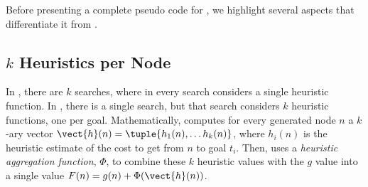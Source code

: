 





Before presenting a complete pseudo code for \kastar, we highlight several aspects that differentiate it from \kxastar.


\subsection{$k$ Heuristics per Node}

In \kxastar, there are $k$ searches, where in every search considers a single heuristic function. In \kastar, there is a single search, but that search considers $k$ heuristic functions, one per goal. 
Mathematically, \kastar computes for every generated node $n$ a $k$-ary vector $\vect{h}(n) = \tuple{h_1(n), \ldots h_k(n)}$, where $h_i(n)$ is the heuristic estimate of the cost to get from $n$ to goal $t_i$. Then, \kastar uses a \emph{heuristic aggregation function}, $\Phi$, to combine these $k$ heuristic values with the $g$ value into a single value $F(n) = g(n) + \Phi(\vect{h}(n))$. 



